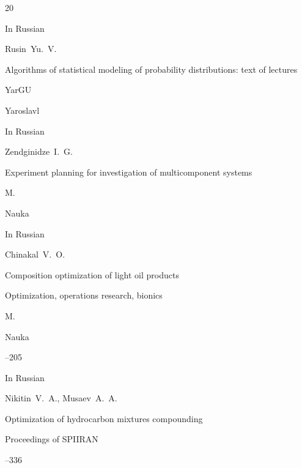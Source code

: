 \begin{thebibliography}{20}

\lang In Russian

\by Rusin~Yu.~V.

\book Algorithms of statistical modeling of probability distributions: text of lectures

\publ YarGU

\publaddr Yaroslavl





\lang In Russian

\by Zendginidze~I.~G.

\book Experiment planning for investigation of multicomponent systems

\publaddr M.

\publ Nauka






\lang In Russian

\by Chinakal~V.~O.

\paper Composition optimization of light oil products

\inbook Optimization, operations research, bionics

\publaddr M.

\publ Nauka


--205




\lang In Russian

\by Nikitin~V.~A., Musaev~A.~A.

\paper Optimization of hydrocarbon mixtures compounding

\jour Proceedings of SPIIRAN



--336



\end{thebibliography}



\EngDate









 















